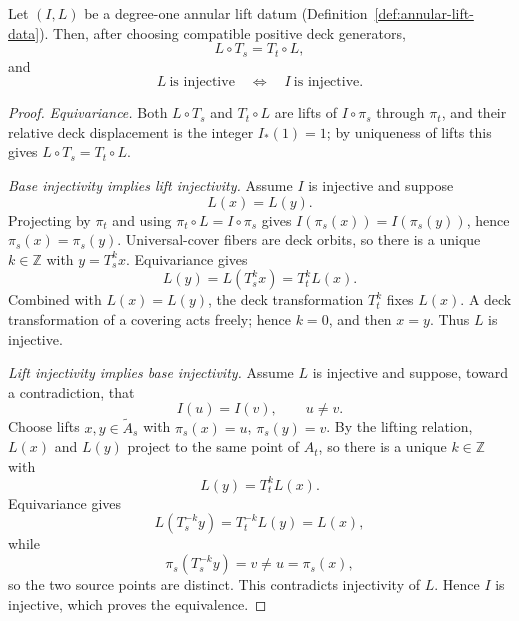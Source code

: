 \begin{theorem}
\label{thm:tile-base-equivalence}
Let \((I,L)\) be a degree-one annular lift datum
(Definition~\ref{def:annular-lift-data}).  Then, after choosing
compatible positive deck generators,
\[
 L\circ T_s=T_t\circ L,
\]
and
\[
 L\ \text{is injective}
 \quad\Longleftrightarrow\quad
 I\ \text{is injective}.
\]
\end{theorem}

\begin{proof}
\emph{Equivariance.}  Both \(L\circ T_s\) and \(T_t\circ L\) are lifts
of \(I\circ\pi_s\) through \(\pi_t\), and their relative deck
displacement is the integer \(I_*(1)=1\); by uniqueness of lifts this
gives \(L\circ T_s=T_t\circ L\).

\emph{Base injectivity implies lift injectivity.}  Assume \(I\) is
injective and suppose
\[
 L(x)=L(y).
\]
Projecting by \(\pi_t\) and using \(\pi_t\circ L=I\circ\pi_s\) gives
\(I(\pi_s(x))=I(\pi_s(y))\), hence \(\pi_s(x)=\pi_s(y)\).
Universal-cover fibers are deck orbits, so there is a unique
\(k\in\mathbb Z\) with \(y=T_s^{k}x\).  Equivariance gives
\[
 L(y)=L(T_s^{k}x)=T_t^{k}L(x).
\]
Combined with \(L(x)=L(y)\), the deck transformation \(T_t^{k}\) fixes
\(L(x)\).  A deck transformation of a covering acts freely; hence
\(k=0\), and then \(x=y\).  Thus \(L\) is injective.

\emph{Lift injectivity implies base injectivity.}  Assume \(L\) is
injective and suppose, toward a contradiction, that
\[
 I(u)=I(v),\qquad u\ne v .
\]
Choose lifts \(x,y\in\widetilde A_s\) with \(\pi_s(x)=u\),
\(\pi_s(y)=v\).  By the lifting relation, \(L(x)\) and \(L(y)\)
project to the same point of \(A_t\), so there is a unique
\(k\in\mathbb Z\) with
\[
 L(y)=T_t^{k}L(x).
\]
Equivariance gives
\[
 L(T_s^{-k}y)=T_t^{-k}L(y)=L(x),
\]
while
\[
 \pi_s(T_s^{-k}y)=v\ne u=\pi_s(x),
\]
so the two source points are distinct.  This contradicts injectivity
of \(L\).  Hence \(I\) is injective, which proves the equivalence.
\end{proof}